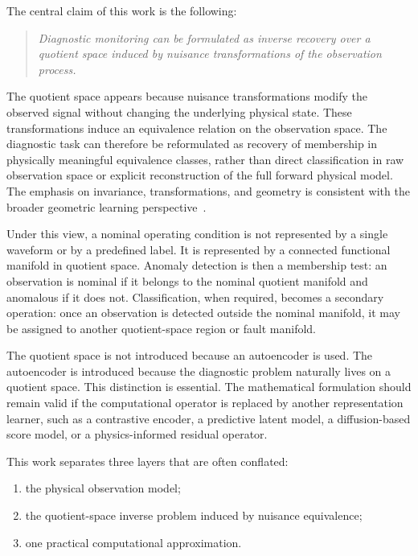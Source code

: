 \documentclass[11pt,letterpaper]{article}
\begin{document}
The central claim of this work is the following:

\begin{quote}
\emph{Diagnostic monitoring can be formulated as inverse recovery over a quotient space induced by nuisance transformations of the observation process.}
\end{quote}

The quotient space appears because nuisance transformations modify the observed signal without changing the underlying physical state. These transformations induce an equivalence relation on the observation space. The diagnostic task can therefore be reformulated as recovery of membership in physically meaningful equivalence classes, rather than direct classification in raw observation space or explicit reconstruction of the full forward physical model. The emphasis on invariance, transformations, and geometry is consistent with the broader geometric learning perspective~\cite{bronstein2021}.

Under this view, a nominal operating condition is not represented by a single waveform or by a predefined label. It is represented by a connected functional manifold in quotient space. Anomaly detection is then a membership test: an observation is nominal if it belongs to the nominal quotient manifold and anomalous if it does not. Classification, when required, becomes a secondary operation: once an observation is detected outside the nominal manifold, it may be assigned to another quotient-space region or fault manifold.

The quotient space is not introduced because an autoencoder is used. The autoencoder is introduced because the diagnostic problem naturally lives on a quotient space. This distinction is essential. The mathematical formulation should remain valid if the computational operator is replaced by another representation learner, such as a contrastive encoder, a predictive latent model, a diffusion-based score model, or a physics-informed residual operator.

This work separates three layers that are often conflated:

\begin{enumerate}[label=(\roman*)]
\item the physical observation model;
\item the quotient-space inverse problem induced by nuisance equivalence;
\item one practical computational approximation.
\end{enumerate}
\end{document}
